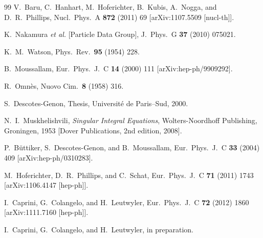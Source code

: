 \documentclass[11pt]{article}%
\begin{document}
\begin{thebibliography}{99}
  V.~Baru, C.~Hanhart, M.~Hoferichter, B.~Kubis, A.~Nogga, and D.~R.~Phillips,
  Nucl.\ Phys.\  A {\bf 872} (2011) 69
  [arXiv:1107.5509 [nucl-th]].

  K.~Nakamura {\it et al.} [Particle Data Group],
  J.\ Phys.\  G {\bf 37} (2010)  075021.

  K.~M.~Watson,
  Phys.\ Rev.\  {\bf 95} (1954)  228.

  B.~Moussallam,
  Eur.\ Phys.\ J.\  C {\bf 14} (2000) 111
  [arXiv:hep-ph/9909292].

  R.~Omn\`es,
  Nuovo Cim.\  {\bf 8} (1958)  316.

 S.~Descotes-Genon,
  Thesis, Universit\'e de Paris--Sud, 2000.

  N.~I.~Muskhelishvili,
  {\it Singular Integral Equations},
  Wolters-Noordhoff Publishing, Groningen, 1953
  [Dover Publications, 2nd edition, 2008].

  P.~B\"uttiker, S.~Descotes-Genon, and B.~Moussallam,
  Eur.\ Phys.\ J.\  C {\bf 33} (2004) 409
  [arXiv:hep-ph/0310283].

  M.~Hoferichter, D.~R.~Phillips, and C.~Schat,
  Eur.\ Phys.\ J.\ C {\bf 71} (2011) 1743
  [arXiv:1106.4147 [hep-ph]].

  I.~Caprini, G.~Colangelo, and H.~Leutwyler,
  Eur.\ Phys.\ J.\ C {\bf 72} (2012) 1860
  [arXiv:1111.7160 [hep-ph]].

 I.~Caprini, G.~Colangelo, and H.~Leutwyler,
  in preparation. %


\end{thebibliography}
\end{document}
